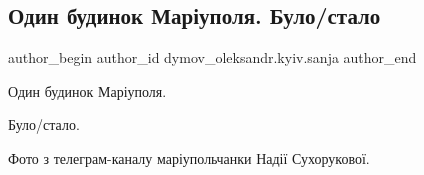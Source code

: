  
 
 
 
 

\subsection{Один будинок Маріуполя. Було/стало}
\label{sec:12_01_2023.fb.dymov_oleksandr.kyiv.sanja.1.odin_budinok_mar_upo}

\ifcmt
 author_begin
   author_id dymov_oleksandr.kyiv.sanja
 author_end
\fi

Один будинок Маріуполя.

Було/стало.

Фото з телеграм-каналу маріупольчанки Надії Сухорукової.
